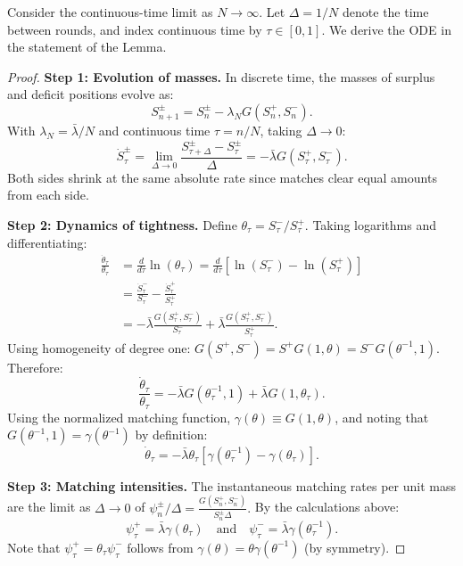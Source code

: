
Consider the continuous-time limit as $N \to \infty$. Let $\Delta = 1/N$ denote the time between rounds, and index continuous time by $\tau \in [0,1]$. We derive the ODE in the statement of the Lemma.

\begin{proof}


\textbf{Step 1: Evolution of masses.} In discrete time, the masses of surplus and deficit positions evolve as:
\[
S_{n+1}^{\pm} = S_n^{\pm} - \lambda_N G(S_n^{+}, S_n^{-}).
\]
With $\lambda_N = \bar{\lambda}/N$ and continuous time $\tau = n/N$, taking $\Delta \to 0$:
\[
\dot{S}_{\tau}^{\pm} = \lim_{\Delta \to 0} \frac{S_{\tau+\Delta}^{\pm} - S_{\tau}^{\pm}}{\Delta} = -\bar{\lambda}G(S_{\tau}^{+}, S_{\tau}^{-}).
\]
Both sides shrink at the same absolute rate since matches clear equal amounts from each side.

\textbf{Step 2: Dynamics of tightness.} Define $\theta_{\tau} = S_{\tau}^{-}/S_{\tau}^{+}$. Taking logarithms and differentiating:
\begin{align*}
\frac{\dot{\theta}_{\tau}}{\theta_{\tau}} &= \frac{d}{d\tau}\ln(\theta_{\tau}) = \frac{d}{d\tau}[\ln(S_{\tau}^{-}) - \ln(S_{\tau}^{+})]\\
&= \frac{\dot{S}_{\tau}^{-}}{S_{\tau}^{-}} - \frac{\dot{S}_{\tau}^{+}}{S_{\tau}^{+}}\\
&= -\bar{\lambda}\frac{G(S_{\tau}^{+}, S_{\tau}^{-})}{S_{\tau}^{-}} + \bar{\lambda}\frac{G(S_{\tau}^{+}, S_{\tau}^{-})}{S_{\tau}^{+}}.
\end{align*}
Using homogeneity of degree one: $G(S^+, S^-) = S^+ G(1, \theta) = S^- G(\theta^{-1}, 1).$
Therefore:
\[
\frac{\dot{\theta}_{\tau}}{\theta_{\tau}} = -\bar{\lambda}G(\theta_{\tau}^{-1}, 1) + \bar{\lambda}G(1, \theta_{\tau}).
\]
Using the normalized matching function, $\gamma(\theta) \equiv G(1, \theta)$, and noting that $G(\theta^{-1}, 1) = \gamma(\theta^{-1})$ by definition:
\[
\dot{\theta}_{\tau} = -\bar{\lambda}\theta_{\tau}[\gamma(\theta_{\tau}^{-1}) - \gamma(\theta_{\tau})]
.\]

\textbf{Step 3: Matching intensities.} The instantaneous matching rates per unit mass are the limit as $\Delta \to 0$ of $\psi_n^{\pm}/\Delta=\frac{G(S^+_n, S^-_n)}{S^{\pm}_n \Delta}.$ By the calculations above:
\[
\psi_{\tau}^{+} = \bar{\lambda}\gamma(\theta_{\tau}) \quad \text{and} \quad \psi_{\tau}^{-} = \bar{\lambda}\gamma(\theta_{\tau}^{-1}).
\]
Note that $\psi_{\tau}^{+} = \theta_{\tau}\psi_{\tau}^{-}$ follows from $\gamma(\theta) = \theta\gamma(\theta^{-1})$ (by symmetry).
\end{proof}